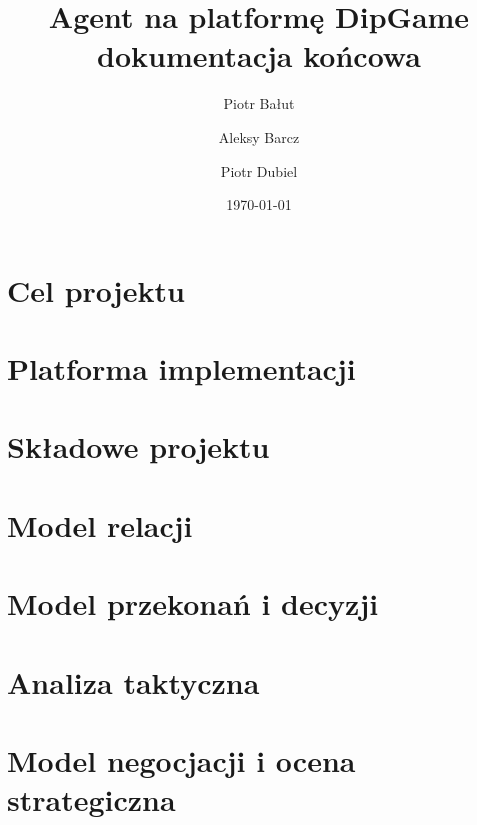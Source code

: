 \documentclass[11pt,a4paper]{report}
\date {\today}
\author {
	Piotr Bałut
	\and
	Aleksy Barcz
	\and
	Piotr Dubiel}
\title{Agent na platformę DipGame\\dokumentacja końcowa}
\begin{document}
\maketitle
\tableofcontents



\chapter{Cel projektu}


\chapter{Platforma implementacji}


\chapter{Składowe projektu}


\chapter{Model relacji}


\chapter{Model przekonań i decyzji}


\chapter{Analiza taktyczna}
%

\chapter{Model negocjacji i ocena strategiczna}
%

\nocite{*}

\end{document}
